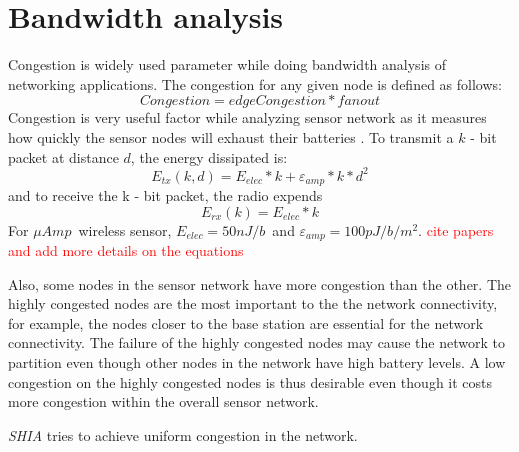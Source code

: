 \section{Bandwidth analysis}
	Congestion is widely used parameter while doing bandwidth analysis of networking applications. 
	The congestion for any given node is defined as follows:
	\begin{equation}
		Congestion = edgeCongestion * fanout
	\end{equation}
	Congestion is very useful factor while analyzing sensor network as it measures how quickly the sensor nodes will exhaust their batteries \cite{madden2003design}. 
	To transmit a $k$ - bit packet at distance $d$, the energy dissipated is:
	\begin{equation}
		E_{tx}(k, d) = E_{elec} * k + \varepsilon_{amp} * k * d^{2}
	\end{equation}
	and to receive the k - bit packet, the radio expends
	\begin{equation}
		E_{rx}(k) = E_{elec} * k
	\end{equation}
	For $\mu Amp$\ wireless sensor, $E_{elec} = 50nJ/b$\ and $\varepsilon_{amp} = 100pJ/b/m^2$. \textcolor{red}{cite papers and add more details on the equations}

	Also, some nodes in the sensor network have more congestion than the other. 
	The highly congested nodes are the most important to the the network connectivity, for example, the nodes closer to the base station are essential for the network connectivity.
	The failure of the highly congested nodes may cause the network to partition even though other nodes in the network have high battery levels.
	A low congestion on the highly congested nodes is thus desirable even though it costs more congestion within the overall sensor network. 

	\textit{SHIA} tries to achieve uniform congestion in the network.	

